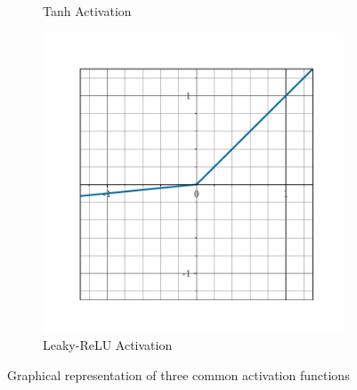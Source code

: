 \begin{figure}[ht]
\begin{subfigure}[b]{0.32\textwidth}
    \caption{Tanh Activation}
  \end{subfigure}
  \hfill
  \begin{subfigure}[b]{0.32\textwidth}
    \includegraphics[width=0.98\textwidth]{figures/main/ch2-background/relu.pdf}
    \caption{Leaky-ReLU Activation}
  \end{subfigure}
  \caption{Graphical representation of three common activation functions}
  \label{figure:ch2-activation_functions}
\end{figure}


